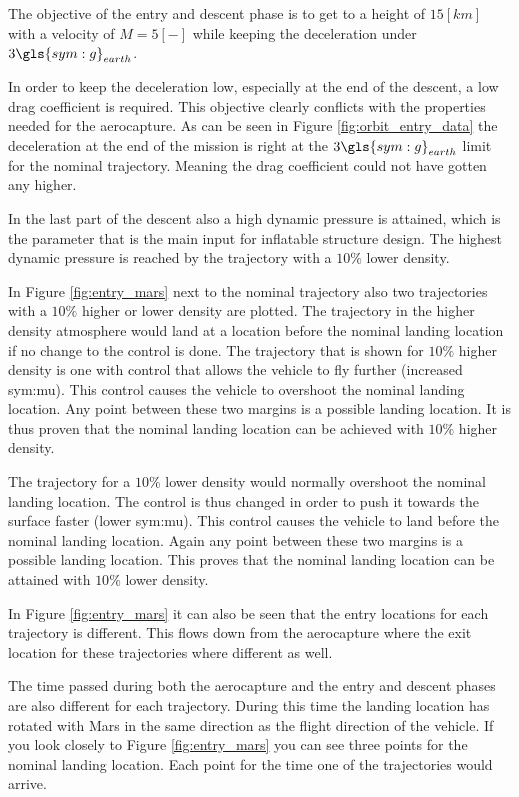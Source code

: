 The objective of the entry and descent phase is to get to a height of $15 \left[km\right]$ with a velocity of $M = 5 \left[-\right]$ while keeping the deceleration under $3 \gls{sym:g}_{earth}$.

In order to keep the deceleration low, especially at the end of the descent, a low drag coefficient is required. This objective clearly conflicts with the properties needed for the aerocapture. As can be seen in Figure \ref{fig:orbit_entry_data} the deceleration at the end of the mission is right at the $3 \gls{sym:g}_{earth}$ limit for the nominal trajectory. Meaning the drag coefficient could not have gotten any higher.

In the last part of the descent also a high dynamic pressure is attained, which is the parameter that is the main input for inflatable structure design. The highest dynamic pressure is reached by the trajectory with a $10\%$ lower density.

In Figure \ref{fig:entry_mars} next to the nominal trajectory also two trajectories with a $10\%$ higher or lower density are plotted. The trajectory in the higher density atmosphere would land at a location before the nominal landing location if no change to the control is done. The trajectory that is shown for $10\%$ higher density is one with control that allows the vehicle to fly further (increased \gls{sym:mu}). This control causes the vehicle to overshoot the nominal landing location. Any point between these two margins is a possible landing location. It is thus proven that the nominal landing location can be achieved with $10\%$ higher density.

The trajectory for a $10\%$ lower density would normally overshoot the nominal landing location. The control is thus changed in order to push it towards the surface faster (lower \gls{sym:mu}). This control causes the vehicle to land before the nominal landing location. Again any point between these two margins is a possible landing location. This proves that the nominal landing location can be attained with $10\%$ lower density.

In Figure \ref{fig:entry_mars} it can also be seen that the entry locations for each trajectory is different. This flows down from the aerocapture where the exit location for these trajectories where different as well.

The time passed during both the aerocapture and the entry and descent phases are also different for each trajectory. During this time the landing location has rotated with Mars in the same direction as the flight direction of the vehicle. If you look closely to Figure \ref{fig:entry_mars} you can see three points for the nominal landing location. Each point for the time one of the trajectories would arrive.


